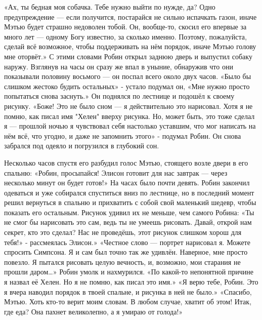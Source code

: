 \documentclass[a4paper,12pt]{book}
\begin{document}
	«Ах, ты бедная моя собачка. Тебе нужно выйти по нужде, да? Одно предупреждение — если получится, постарайся не сильно испачкать газон, иначе Мэтью будет страшно недоволен тобой. Он, вообще-то, скосил его впервые за много лет — одному Богу известно, за сколько именно. Поэтому, пожалуйста, сделай всё возможное, чтобы поддерживать на нём порядок, иначе Мэтью голову мне оторвёт.»
	С этими словами Робин открыл заднюю дверь и выпустил собаку наружу. Взглянув на часы он сразу же впал в уныние, обнаружив что они показывали половину восьмого — он поспал всего около двух часов.
	«Было бы слишком жестоко будить остальных» - устало подумал он,
	«Мне нужно просто попытаться снова заснуть.»
	Он поднялся по лестнице и подошёл к своему рисунку.
	«Боже! Это не было сном — я действительно это нарисовал. Хотя я не помню, как писал имя "Хелен" вверху рисунка. Но, может быть, это тоже сделал я — прошлой ночью я чувствовал себя настолько уставшим, что мог написать на нём всё, что угодно, и даже не запомнить этого» - подумал Робин. Он снова забрался под одеяло и погрузился в глубокий сон.

	Несколько часов спустя его разбудил голос Мэтью, стоящего возле двери в его спальню:
	«Робин, просыпайся! Элисон готовит для нас завтрак — через несколько минут он будет готов!»
	На часах было почти девять. Робин закончил одеваться и уже собирался спуститься вниз по лестнице, но в последний момент решил вернуться в спальню и прихватить с собой свой маленький шедевр, чтобы показать его остальным. 
	 Рисунок удивил их не меньше, чем самого Робина:
	«Ты не смог бы нарисовать это сам, ведь ты не умеешь рисовать. Давай, открой нам секрет, кто это сделал? Нас не проведёшь, этот рисунок слишком хорош для тебя!» - рассмеялась Элисон.»
	«Честное слово — портрет нарисовал я. Можете спросить Симпсона. Я и сам был точно так же удивлён. Наверное, мне просто повезло. Я пытался рисовать целую вечность, и, возможно, мои старания не прошли даром…»
	Робин умолк и нахмурился.
	«По какой-то непонятной причине я назвал её Хелен. Но я не помню, как писал это имя.»
	«Я верю тебе, Робин. Это я вчера наводил порядок в твоей спальне, и рисунка в ней не было.»
	«Спасибо, Мэтью. Хоть кто-то верит моим словам. В любом случае, хватит об этом! Итак, где еда? Она пахнет великолепно, а я умираю от голода!»
\end{document}
